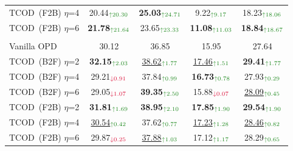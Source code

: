 \documentclass{article} %
\newcommand{\ours}{TCOD\xspace}
\begin{document}
\begin{table}[t]
{\begin{tabular}{lcccc}
\rowcolor{f2bcolor}
\quad \ours~(F2B) $\eta$=4
    & 20.44$_{\color{mygreen}\uparrow 20.30}$
    & \textbf{25.03}$_{\color{mygreen}\uparrow 24.71}$
    & 9.22$_{\color{mygreen}\uparrow 9.17}$
    & 18.23$_{\color{mygreen}\uparrow 18.06}$ \\
\rowcolor{f2bcolor}
\quad \ours~(F2B) $\eta$=6
    & \textbf{21.78}$_{\color{mygreen}\uparrow 21.64}$
    & 23.65$_{\color{mygreen}\uparrow 23.33}$
    & \textbf{11.08}$_{\color{mygreen}\uparrow 11.03}$
    & \textbf{18.84}$_{\color{mygreen}\uparrow 18.67}$ \\
\midrule
\rowcolor{groupcolor}
\multicolumn{5}{c}{\textit{Qwen3-4B}~{\small\textcolor{gray}{(Student)}}} \\
\quad Vanilla OPD
    & 30.12 & 36.85 & 15.95 & 27.64 \\
\midrule
\rowcolor{b2fcolor}
\quad \ours~(B2F) $\eta$=2
    & \textbf{32.15}$_{\color{mygreen}\uparrow 2.03}$
    & \underline{38.62}$_{\color{mygreen}\uparrow 1.77}$
    & \underline{17.46}$_{\color{mygreen}\uparrow 1.51}$
    & \textbf{29.41}$_{\color{mygreen}\uparrow 1.77}$ \\
\rowcolor{b2fcolor}
\quad \ours~(B2F) $\eta$=4
    & 29.21$_{\color{myred}\downarrow 0.91}$
    & 37.84$_{\color{mygreen}\uparrow 0.99}$
    & \textbf{16.73}$_{\color{mygreen}\uparrow 0.78}$
    & 27.93$_{\color{mygreen}\uparrow 0.29}$ \\
\rowcolor{b2fcolor}
\quad \ours~(B2F) $\eta$=6
    & 29.05$_{\color{myred}\downarrow 1.07}$
    & \textbf{39.35}$_{\color{mygreen}\uparrow 2.50}$
    & 15.88$_{\color{myred}\downarrow 0.07}$
    & \underline{28.09}$_{\color{mygreen}\uparrow 0.45}$ \\
\midrule
\rowcolor{f2bcolor}
\quad \ours~(F2B) $\eta$=2
    & \textbf{31.81}$_{\color{mygreen}\uparrow 1.69}$
    & \textbf{38.95}$_{\color{mygreen}\uparrow 2.10}$
    & \textbf{17.85}$_{\color{mygreen}\uparrow 1.90}$
    & \textbf{29.54}$_{\color{mygreen}\uparrow 1.90}$ \\
\rowcolor{f2bcolor}
\quad \ours~(F2B) $\eta$=4
    & \underline{30.54}$_{\color{mygreen}\uparrow 0.42}$
    & 37.62$_{\color{mygreen}\uparrow 0.77}$
    & \underline{17.23}$_{\color{mygreen}\uparrow 1.28}$
    & \underline{28.46}$_{\color{mygreen}\uparrow 0.82}$ \\
\rowcolor{f2bcolor}
\quad \ours~(F2B) $\eta$=6
    & 29.87$_{\color{myred}\downarrow 0.25}$
    & \underline{37.88}$_{\color{mygreen}\uparrow 1.03}$
    & 17.12$_{\color{mygreen}\uparrow 1.17}$
    & 28.29$_{\color{mygreen}\uparrow 0.65}$ \\
\bottomrule
\end{tabular}
}
\end{table}
\end{document}
